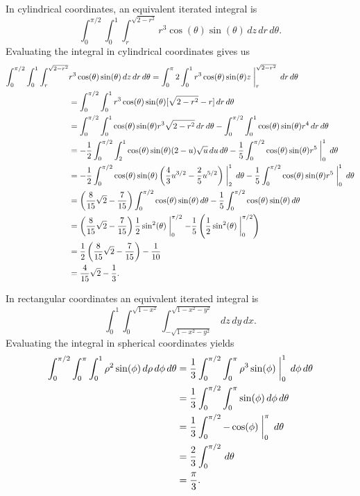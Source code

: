\begin{exercises}
\begin{exerciseSolution}
	\ba
		\item In cylindrical coordinates, an equivalent iterated integral is 
\[\int_{0}^{\pi/2} \int_{0}^{1} \int_{r}^{\sqrt{2-r^2}} r^3 \cos(\theta) \sin(\theta) \, dz \, dr \, d\theta.\]
Evaluating the integral in cylindrical coordinates gives us 
\begin{align*}
\int_{0}^{\pi/2} \int_{0}^{1} \int_{r}^{\sqrt{2-r^2}} & r^3 \cos(\theta) \sin(\theta) \, dz \, dr \, d\theta = \int_{0}^{\pi}{2} \int_{0}^{1}  r^3 \cos(\theta) \sin(\theta)z\biggm|_{r}^{\sqrt{2-r^2}}  \, dr \, d\theta \\
	&= \int_{0}^{\pi/2} \int_{0}^{1}  r^3 \cos(\theta) \sin(\theta)[\sqrt{2-r^2} - r]  \, dr \, d\theta \\
	&= \int_{0}^{\pi/2} \int_{0}^{1}   \cos(\theta) \sin(\theta) r^3\sqrt{2-r^2} \, dr \, d\theta -  \int_{0}^{\pi/2} \int_{0}^{1}   \cos(\theta) \sin(\theta) r^4  \, dr \, d\theta \\
	&= -\frac{1}{2}\int_{0}^{\pi/2} \int_{2}^{1}   \cos(\theta) \sin(\theta) (2-u)\sqrt{u} \, du \, d\theta -  \frac{1}{5} \int_{0}^{\pi/2} \cos(\theta) \sin(\theta) r^5\biggm|_{0}^{1}   \, d\theta \\
	&= -\frac{1}{2}\int_{0}^{\pi/2}  \cos(\theta) \sin(\theta) \left(\frac{4}{3}u^{3/2}-\frac{2}{5}u^{5/2}\right)\biggm|_{2}^{1}  \, d\theta -  \frac{1}{5} \int_{0}^{\pi/2} \cos(\theta) \sin(\theta) r^5\biggm|_{0}^{1}   \, d\theta \\
	&= \left(\frac{8}{15}\sqrt{2}-\frac{7}{15}\right)\int_{0}^{\pi/2}  \cos(\theta) \sin(\theta)   \, d\theta -  \frac{1}{5} \int_{0}^{\pi/2} \cos(\theta) \sin(\theta)  \, d\theta \\
	&= \left(\frac{8}{15}\sqrt{2}-\frac{7}{15}\right) \frac{1}{2}\sin^2(\theta)\biggm|_{0}^{\pi/2}  -  \frac{1}{5}\left(\frac{1}{2}\sin^2(\theta)\biggm|_{0}^{\pi/2} \right) \\
	&= \frac{1}{2} \left(\frac{8}{15}\sqrt{2}-\frac{7}{15}\right)  -  \frac{1}{10}  \\
	&= \frac{4}{15}\sqrt{2}- \frac{1}{3}.
\end{align*}

		\item In rectangular coordinates an equivalent iterated integral is 
\[\int_{0}^{1} \int_{0}^{\sqrt{1-x^2}} \int_{-\sqrt{1-x^2-y^2}}^{\sqrt{1-x^2-y^2}} \, dz \, dy \, dx.\]
Evaluating the integral in spherical coordinates yields
\begin{align*}
\int_{0}^{\pi/2} \int_{0}^{\pi} \int_{0}^{1} \rho^2 \sin(\phi) \, d\rho \, d\phi \, d\theta &= \frac{1}{3} \int_{0}^{\pi/2} \int_{0}^{\pi}  \rho^3 \sin(\phi)\biggm|_{0}^{1} \, d\phi \, d\theta \\
	&= \frac{1}{3} \int_{0}^{\pi/2} \int_{0}^{\pi}  \sin(\phi) \, d\phi \, d\theta \\
	&= \frac{1}{3} \int_{0}^{\pi/2}   -\cos(\phi)\biggm|_{0}^{\pi} \, d\theta \\
	&= \frac{2}{3} \int_{0}^{\pi/2}  \, d\theta \\
	&= \frac{\pi}{3}. 
\end{align*}
	

\end{exerciseSolution}
\end{exercises}
